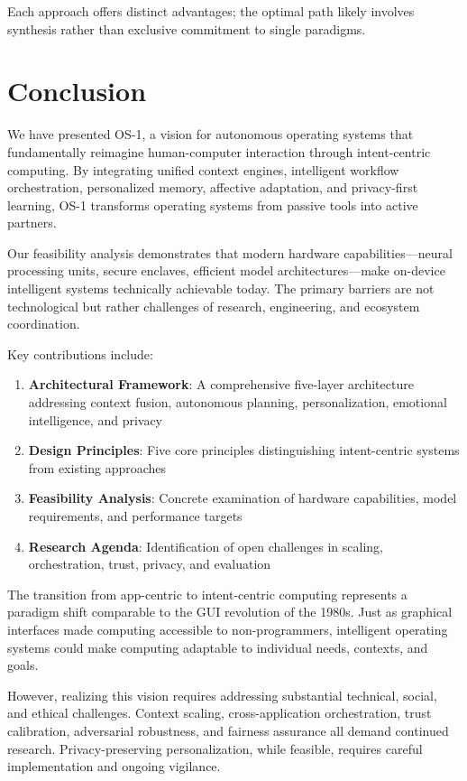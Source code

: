 \documentclass[conference]{IEEEtran}
\begin{document}
Each approach offers distinct advantages; the optimal path likely involves synthesis rather than exclusive commitment to single paradigms.

\section{Conclusion}

We have presented OS-1, a vision for autonomous operating systems that fundamentally reimagine human-computer interaction through intent-centric computing. By integrating unified context engines, intelligent workflow orchestration, personalized memory, affective adaptation, and privacy-first learning, OS-1 transforms operating systems from passive tools into active partners.

Our feasibility analysis demonstrates that modern hardware capabilities—neural processing units, secure enclaves, efficient model architectures—make on-device intelligent systems technically achievable today. The primary barriers are not technological but rather challenges of research, engineering, and ecosystem coordination.

Key contributions include:

\begin{enumerate}
\item \textbf{Architectural Framework}: A comprehensive five-layer architecture addressing context fusion, autonomous planning, personalization, emotional intelligence, and privacy
\item \textbf{Design Principles}: Five core principles distinguishing intent-centric systems from existing approaches
\item \textbf{Feasibility Analysis}: Concrete examination of hardware capabilities, model requirements, and performance targets
\item \textbf{Research Agenda}: Identification of open challenges in scaling, orchestration, trust, privacy, and evaluation
\end{enumerate}

The transition from app-centric to intent-centric computing represents a paradigm shift comparable to the GUI revolution of the 1980s. Just as graphical interfaces made computing accessible to non-programmers, intelligent operating systems could make computing adaptable to individual needs, contexts, and goals.

However, realizing this vision requires addressing substantial technical, social, and ethical challenges. Context scaling, cross-application orchestration, trust calibration, adversarial robustness, and fairness assurance all demand continued research. Privacy-preserving personalization, while feasible, requires careful implementation and ongoing vigilance.
\end{document}
